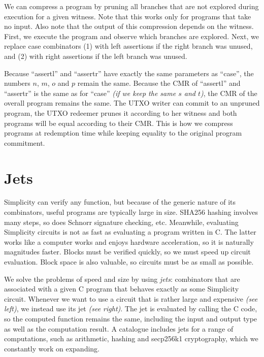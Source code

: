 We can compress a program by pruning all branches that are not explored during execution for a given witness.
Note that this works only for programs that take no input.
Also note that the output of this compression depends on the witness.
First,
we execute the program and observe which branches are explored.
Next,
we replace case combinators
(1) with left assertions if the right branch was unused, and
(2) with right assertions if the left branch was unused.

Because \enquote{assertl} and \enquote{assertr} have exactly the same parameters as \enquote{case},
the numbers $n$, $m$, $o$ and $p$ remain the same.
Because the CMR of \enquote{assertl} and \enquote{assertr} is the same as for \enquote{case}
\emph{(if we keep the same $s$ and $t$)}, the CMR of the overall program remains the same.
The UTXO writer can commit to an unpruned program,
the UTXO redeemer prunes it according to her witness
and both programs will be equal according to their CMR.
This is how we compress programs at redemption time while keeping equality to the original program commitment.

%
%
%

\section{Jets}%
\label{sec:jets}

Simplicity can verify any function,
but because of the generic nature of its combinators,
useful programs are typically large in size.
SHA256 hashing involves many steps,
so does Schnorr signature checking,
etc.
Meanwhile,
evaluating Simplicity circuits is not as fast as evaluating a program written in C.
The latter works like a computer works and enjoys hardware acceleration,
so it is naturally magnitudes faster.
Blocks must be verified quickly,
so we must speed up circuit evaluation.
Block space is also valuable,
so circuits must be as small as possible.


%
We solve the problems of speed and size by using \emph{jets}:
combinators that are associated with a given C program that behaves exactly as some Simplicity circuit.
Whenever we want to use a circuit that is rather large and expensive \emph{(see left)},
we instead use its jet \emph{(see right)}.
The jet is evaluated by calling the C code,
so the computed function remains the same,
including the input and output type as well as the computation result.
A catalogue includes jets for a range of computations,
such as arithmetic, hashing and secp256k1 cryptography,
which we constantly work on expanding.

